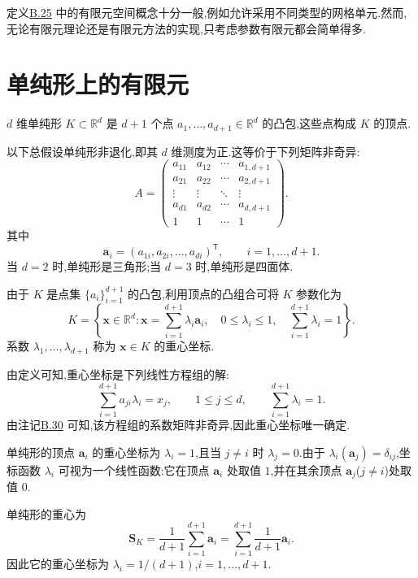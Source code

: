\begin{note}[使用参数有限元的动机]\label{note:appendix-b-28}
定义\hyperref[def:appendix-b-25]{B.25} 中的有限元空间概念十分一般,例如允许采用不同类型的网格单元.然而,无论有限元理论还是有限元方法的实现,只考虑参数有限元都会简单得多.
\end{note}

\section{单纯形上的有限元}\label{sec:appendix-b-3}

\begin{definition}[$d$ 维单纯形]\label{def:appendix-b-29}
$d$ 维单纯形 $K\subset\mathbb R^d$ 是 $d+1$ 个点
$a_1,\ldots,a_{d+1}\in\mathbb R^d$ 的凸包,这些点构成 $K$ 的顶点.
\end{definition}

\begin{note}[关于 $d$ 维单纯形]\label{note:appendix-b-30}
以下总假设单纯形非退化,即其 $d$ 维测度为正.这等价于下列矩阵非奇异:
\[
 A=
 \begin{pmatrix}
 a_{11}&a_{12}&\cdots&a_{1,d+1}\\
 a_{21}&a_{22}&\cdots&a_{2,d+1}\\
 \vdots&\vdots&\ddots&\vdots\\
 a_{d1}&a_{d2}&\cdots&a_{d,d+1}\\
 1&1&\cdots&1
  \end{pmatrix}.
 \]
其中
\[
 \bm a_i=(a_{1i},a_{2i},\ldots,a_{di})^{\mathsf T},
 \qquad i=1,\ldots,d+1.
\]
当 $d=2$ 时,单纯形是三角形;当 $d=3$ 时,单纯形是四面体.
\end{note}

\begin{definition}[重心坐标]\label{def:appendix-b-31}
由于 $K$ 是点集 $\{a_i\}_{i=1}^{d+1}$ 的凸包,利用顶点的凸组合可将 $K$ 参数化为
\[
 K=\left\{\bm x\in\mathbb R^d:
 \bm x=\sum_{i=1}^{d+1}\lambda_i\bm a_i,\quad
 0\le\lambda_i\le1,\quad
 \sum_{i=1}^{d+1}\lambda_i=1\right\}.
\]
系数 $\lambda_1,\ldots,\lambda_{d+1}$ 称为 $\bm x\in K$ 的重心坐标.
\end{definition}

\begin{note}[关于重心坐标]\label{note:appendix-b-32}
由定义可知,重心坐标是下列线性方程组的解:
\[
 \sum_{i=1}^{d+1}a_{ji}\lambda_i=x_j,\qquad
 1\le j\le d,\qquad
 \sum_{i=1}^{d+1}\lambda_i=1.
\]
由注记\hyperref[note:appendix-b-30]{B.30} 可知,该方程组的系数矩阵非奇异,因此重心坐标唯一确定.

单纯形的顶点 $\bm a_i$ 的重心坐标为 $\lambda_i=1$,且当 $j\ne i$ 时 $\lambda_j=0$.由于 $\lambda_i(\bm a_j)=\delta_{ij}$,坐标函数 $\lambda_i$ 可视为一个线性函数:它在顶点 $\bm a_i$ 处取值 $1$,并在其余顶点 $\bm a_j$($j\ne i$)处取值 $0$.

单纯形的重心为
\[
 \bm S_K=\frac1{d+1}\sum_{i=1}^{d+1}\bm a_i
 =\sum_{i=1}^{d+1}\frac1{d+1}\bm a_i.
\]
因此它的重心坐标为
$\lambda_i=1/(d+1)$,$i=1,\ldots,d+1$.
\end{note}

